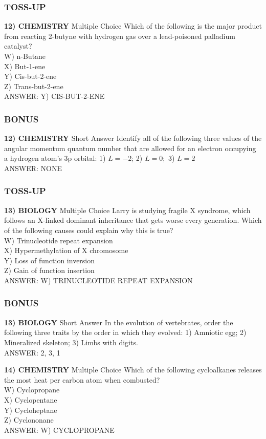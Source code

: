 \newpage

\subsubsection*{TOSS-UP}
\textbf{12) CHEMISTRY}
Multiple Choice Which of the following is the major product from reacting 2-butyne with hydrogen gas over a lead-poisoned palladium catalyst?
\\W) n-Butane
\\X) But-1-ene
\\Y) Cis-but-2-ene
\\Z) Trans-but-2-ene
\\ANSWER: Y) CIS-BUT-2-ENE

\subsubsection*{BONUS}
\textbf{12) CHEMISTRY}
Short Answer Identify all of the following three values of the angular momentum quantum number that are allowed for an electron occupying a hydrogen atom's 3p orbital: 1) $L=-2$; 2) $L=0;$ 3) $L=2$
\\ANSWER: NONE

\subsubsection*{TOSS-UP}
\textbf{13) BIOLOGY}
Multiple Choice Larry is studying fragile X syndrome, which follows an X-linked dominant inheritance that gets worse every generation. Which of the following causes could explain why this is true?
\\W) Trinucleotide repeat expansion
\\X) Hypermethylation of X chromosome
\\Y) Loss of function inversion
\\Z) Gain of function insertion
\\ANSWER: W) TRINUCLEOTIDE REPEAT EXPANSION

\subsubsection*{BONUS}
\textbf{13) BIOLOGY}
Short Answer In the evolution of vertebrates, order the following three traits by the order in which they evolved: 1) Amniotic egg; 2) Mineralized skeleton; 3) Limbs with digits.
\\ANSWER: 2, 3, 1

\newpage

\textbf{14) CHEMISTRY}
Multiple Choice Which of the following cycloalkanes releases the most heat per carbon atom when combusted?
\\W) Cyclopropane
\\X) Cyclopentane
\\Y) Cycloheptane
\\Z) Cyclononane
\\ANSWER: W) CYCLOPROPANE


